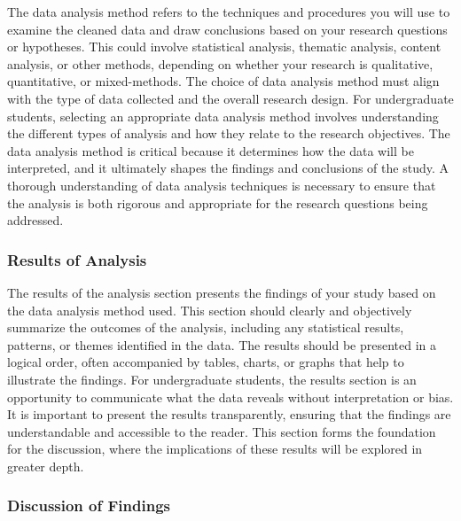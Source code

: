 \documentclass[
]{book}
\begin{document}
The data analysis method refers to the techniques and procedures you will use to examine the cleaned data and draw conclusions based on your research questions or hypotheses. This could involve statistical analysis, thematic analysis, content analysis, or other methods, depending on whether your research is qualitative, quantitative, or mixed-methods. The choice of data analysis method must align with the type of data collected and the overall research design. For undergraduate students, selecting an appropriate data analysis method involves understanding the different types of analysis and how they relate to the research objectives. The data analysis method is critical because it determines how the data will be interpreted, and it ultimately shapes the findings and conclusions of the study. A thorough understanding of data analysis techniques is necessary to ensure that the analysis is both rigorous and appropriate for the research questions being addressed.

\subsubsection*{Results of Analysis}\label{results-of-analysis}

The results of the analysis section presents the findings of your study based on the data analysis method used. This section should clearly and objectively summarize the outcomes of the analysis, including any statistical results, patterns, or themes identified in the data. The results should be presented in a logical order, often accompanied by tables, charts, or graphs that help to illustrate the findings. For undergraduate students, the results section is an opportunity to communicate what the data reveals without interpretation or bias. It is important to present the results transparently, ensuring that the findings are understandable and accessible to the reader. This section forms the foundation for the discussion, where the implications of these results will be explored in greater depth.

\subsubsection*{Discussion of Findings}\label{discussion-of-findings}
\end{document}

